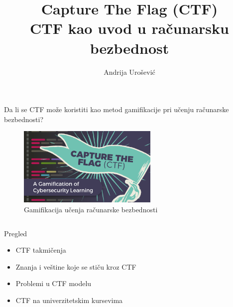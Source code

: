 \documentclass{beamer}
\author[andrija.urosevic@protonmail.com]{Andrija Urošević}
\title{Capture The Flag (CTF)\\  CTF kao uvod u računarsku bezbednost}
\institute{Univerzitet u Beogradu\\ Matematički fakultet}
\begin{document}
\begin{frame}[fragile]
    \centering


    \begin{block}
        {Da li se CTF može koristiti kao metod gamifikacije pri učenju
        računarske bezbednosti?}
        \begin{figure}
            \centering
            \includegraphics[width=0.6\textwidth]{Slike/ctf_gami.png}
            \caption{Gamifikacija učenja računarske
            bezbednosti}\label{fig:ctfgami}
        \end{figure}
    \end{block}


    \begin{columns}[T]

        \begin{column}{.46\textwidth}


            \begin{block}{Pregled}
                \begin{itemize}
                    \item CTF takmičenja
                    \item Znanja i veštine koje se stiču kroz CTF
                    \item Problemi u CTF modelu
                    \item CTF na univerzitetskim kursevima
                \end{itemize}
            \end{block}


\end{column}
\end{columns}
\end{frame}
\end{document}
